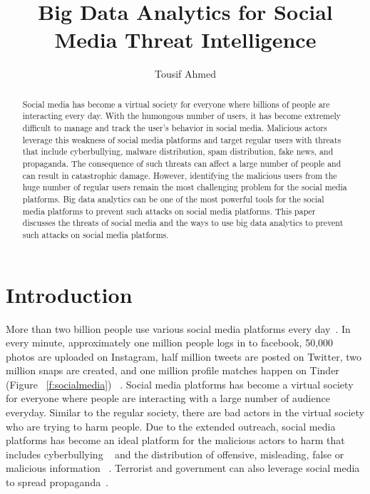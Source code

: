 \documentclass[sigconf]{acmart}
\begin{document}
\title{Big Data Analytics for Social Media Threat Intelligence}


\author{Tousif Ahmed}



\begin{abstract}
Social media has become a virtual society for everyone where billions of people are interacting every day. With the humongous number of users, it has become extremely difficult to manage and track the user's behavior in social media.  Malicious actors leverage this weakness of social media platforms and target regular users with threats that include cyberbullying, malware distribution, spam distribution, fake news, and propaganda.  The consequence of such threats can affect a large number of people and can result in catastrophic damage. However, identifying the malicious users from the huge number of regular users remain the most challenging problem for the social media platforms. Big data analytics can be one of the most powerful tools for the social media platforms to prevent such attacks on social media platforms. This paper discusses the threats of social media and the ways to use big data analytics to prevent such attacks on social media platforms. 

\end{abstract}



\maketitle



\section{Introduction}
More than two billion people use various social media platforms every day~\cite{social-media}. In every minute, approximately one million people logs in to facebook, 50,000 photos are uploaded on Instagram, half million tweets are posted on Twitter, two million snaps are created, and one million profile matches happen on Tinder (Figure ~\ref{f:socialmedia}) ~\cite{social-media2}. Social media platforms has become a virtual society for everyone where people are interacting with a large number of audience everyday. Similar to the regular society, there are bad actors in the virtual society who are trying to harm people. Due to the extended outreach, social media platforms has become an ideal platform for the malicious actors to harm that includes cyberbullying ~\cite{Slonje:2013,Kwan:2013,Singh:2017,Cheng:2017,HosseinmardiMRH15} and the distribution of offensive, misleading, false or malicious information ~\cite{Menczer:2016, socialbots-CACM, Shao15hoaxy, Shao17hoaxybots}. Terrorist and government can also leverage social media to spread propaganda~\cite{Aro2016,Weimann:2006}.
\end{document}

